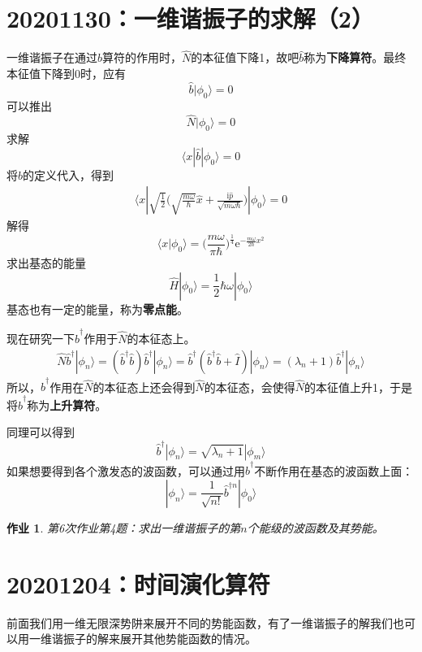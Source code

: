 \documentclass[12pt]{article}
\newtheorem{asg}{作业}
\begin{document}
\section{20201130：一维谐振子的求解（2）}

    一维谐振子在通过$\hat{b}$算符的作用时，$\hat{N}$的本征值下降1，故吧$\hat{b}$称为\textbf{下降算符}。最终本征值下降到0时，应有
    \[ \hat{b}|\phi_0 \rangle = 0 \]
    可以推出
    \[ \hat{N}|\phi_0 \rangle = 0 \]
    求解
    \[ \langle x|\hat{b}|\phi_0 \rangle = 0\]
    将$\hat{b}$的定义代入，得到
    \begin{align*}
        \langle x|\sqrt{\frac 12}\bigg(\sqrt{\frac {m\omega}{\hbar}}\hat{x}+ \frac {\mathrm{i}\hat{p}}{\sqrt{m\omega\hbar}}\bigg)|\phi_0 \rangle = 0
    \end{align*}
    解得
    \[ \langle x|\phi_0\rangle = \bigg(\frac {m\omega}{\pi\hbar} \bigg)^{\frac 14} \mathrm{e}^{-\frac {m\omega}{2\hbar}x^2} \]
    求出基态的能量
    \[ \hat{H}|\phi_0 \rangle = \frac 12 \hbar \omega |\phi_0 \rangle \]
    基态也有一定的能量，称为\textbf{零点能}。

    现在研究一下$\hat{b}^\dagger$作用于$\hat{N}$的本征态上。
    \begin{align*}
        \hat{N}\hat{b}^\dagger |\phi_n \rangle = (\hat{b}^\dagger \hat{b})\hat{b}^\dagger |\phi_n \rangle = \hat{b}^\dagger (\hat{b}^\dagger\hat{b}+\hat{I})|\phi_n \rangle = (\lambda_n+1) \hat{b}^\dagger |\phi_n \rangle
    \end{align*}
    所以，$\hat{b}^\dagger$作用在$\hat{N}$的本征态上还会得到$\hat{N}$的本征态，会使得$\hat{N}$的本征值上升1，于是将$\hat{b}^\dagger$称为\textbf{上升算符}。

    同理可以得到
    \[ \hat{b}^\dagger|\phi_n\rangle = \sqrt{\lambda_n+1}|\phi_m\rangle \]
    如果想要得到各个激发态的波函数，可以通过用$\hat{b}^\dagger$不断作用在基态的波函数上面：
    \[ |\phi_n \rangle = \frac 1{\sqrt{n!}} \hat{b}^{\dagger n} | \phi_0 \rangle \]

    \begin{asg}
        第6次作业第4题：求出一维谐振子的第$n$个能级的波函数及其势能。
    \end{asg}

\section{20201204：时间演化算符}

    前面我们用一维无限深势阱来展开不同的势能函数，有了一维谐振子的解我们也可以用一维谐振子的解来展开其他势能函数的情况。
\end{document}
